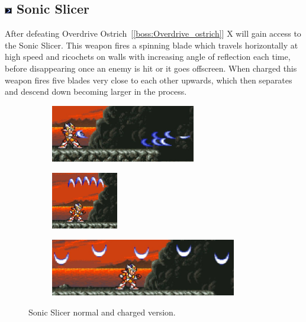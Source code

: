 \subsection{\includegraphics[width=12px, height=10px]{figures/X2/weapons/S_slicer.png} Sonic Slicer}\label{Sonic_slicer}
After defeating Overdrive Ostrich~[\ref{boss:Overdrive_ostrich}] X will gain access to the Sonic Slicer. This weapon fires a spinning blade which travels horizontally at high speed and ricochets on walls with increasing angle of reflection each time, before disappearing once an enemy is hit or it goes offscreen. When charged this weapon fires five blades very close to each other upwards, which then separates and descend down becoming larger in the process.

\begin{figure}[htp]
	\centering
	\begin{subfigure}{\linewidth}
		\centering
		\includegraphics[height=2.5cm]{figures/X2/weapons/S_slicer_1.png}	
	\end{subfigure}
	\begin{subfigure}{0.25\linewidth}
		\centering
		\includegraphics[height=2.5cm]{figures/X2/weapons/S_slicer_2.png}	
	\end{subfigure}
	\begin{subfigure}{0.7\linewidth}
		\centering
		\includegraphics[height=2.5cm]{figures/X2/weapons/S_slicer_3.png}	
	\end{subfigure}
	\caption{Sonic Slicer normal and charged version.}
\end{figure}


